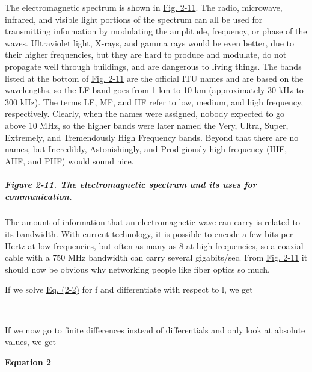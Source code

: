 The electromagnetic spectrum is shown in
\protect\hyperlink{0130661023_ch02lev1sec3.htmlux5cux23ch02fig11}{Fig.
2-11}. The radio, microwave, infrared, and visible light portions of the
spectrum can all be used for transmitting information by modulating the
amplitude, frequency, or phase of the waves. Ultraviolet light, X-rays,
and gamma rays would be even better, due to their higher frequencies,
but they are hard to produce and modulate, do not propagate well through
buildings, and are dangerous to living things. The bands listed at the
bottom of
\protect\hyperlink{0130661023_ch02lev1sec3.htmlux5cux23ch02fig11}{Fig.
2-11} are the official ITU names and are based on the wavelengths, so
the LF band goes from 1 km to 10 km (approximately 30 kHz to 300 kHz).
The terms LF, MF, and HF refer to low, medium, and high frequency,
respectively. Clearly, when the names were assigned, nobody expected to
go above 10 MHz, so the higher bands were later named the Very, Ultra,
Super, Extremely, and Tremendously High Frequency bands. Beyond that
there are no names, but Incredibly, Astonishingly, and Prodigiously high
frequency (IHF, AHF, and PHF) would sound nice.

\subparagraph[Figure 2-11. The electromagnetic spectrum and its uses for
communication.]{\texorpdfstring{\protect\hypertarget{0130661023_ch02lev1sec3.htmlux5cux23ch02fig11}{}{}Figure
2-11. The electromagnetic spectrum and its uses for
communication.}{Figure 2-11. The electromagnetic spectrum and its uses for communication.}}


The amount of information that an electromagnetic wave can carry is
related to its bandwidth. With current technology, it is possible to
encode a few bits per Hertz at low frequencies, but often as many as 8
at high frequencies, so a coaxial cable with a 750 MHz bandwidth can
carry several gigabits/sec. From
\protect\hyperlink{0130661023_ch02lev1sec3.htmlux5cux23ch02fig11}{Fig.
2-11} it should now be obvious why networking people like fiber optics
so much.

If we solve
\protect\hyperlink{0130661023_ch02lev1sec3.htmlux5cux23ch02eq02}{Eq.
(2-2)} for {f} and differentiate with respect to {l}, we get


~

If we now go to finite differences instead of differentials and only
look at absolute values, we get

\textbf{\protect\hypertarget{0130661023_ch02lev1sec3.htmlux5cux23ch02eq03}{}{}
Equation 2}

